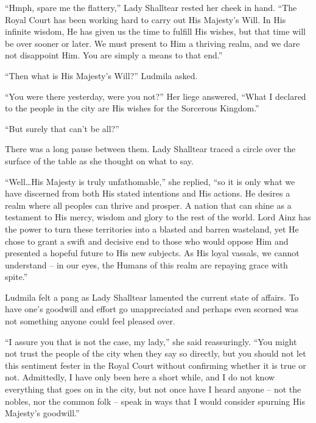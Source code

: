  

“Hmph, spare me the flattery,” Lady Shalltear rested her cheek in hand. “The Royal Court has been working hard to carry out His Majesty’s Will. In His infinite wisdom, He has given us the time to fulfill His wishes, but that time will be over sooner or later. We must present to Him a thriving realm, and we dare not disappoint Him. You are simply a means to that end.”

 

“Then what is His Majesty’s Will?” Ludmila asked.

 

“You were there yesterday, were you not?” Her liege answered, “What I declared to the people in the city are His wishes for the Sorcerous Kingdom.”

 

“But surely that can’t be all?”

 

There was a long pause between them. Lady Shalltear traced a circle over the surface of the table as she thought on what to say.

 

“Well…His Majesty is truly unfathomable,” she replied, “so it is only what we have discerned from both His stated intentions and His actions. He desires a realm where all peoples can thrive and prosper. A nation that can shine as a testament to His mercy, wisdom and glory to the rest of the world. Lord Ainz has the power to turn these territories into a blasted and barren wasteland, yet He chose to grant a swift and decisive end to those who would oppose Him and presented a hopeful future to His new subjects. As His loyal vassals, we cannot understand – in our eyes, the Humans of this realm are repaying grace with spite.”

 

Ludmila felt a pang as Lady Shalltear lamented the current state of affairs. To have one’s goodwill and effort go unappreciated and perhaps even scorned was not something anyone could feel pleased over.

 

“I assure you that is not the case, my lady,” she said reassuringly. “You might not trust the people of the city when they say so directly, but you should not let this sentiment fester in the Royal Court without confirming whether it is true or not. Admittedly, I have only been here a short while, and I do not know everything that goes on in the city, but not once have I heard anyone – not the nobles, nor the common folk – speak in ways that I would consider spurning His Majesty’s goodwill.”

